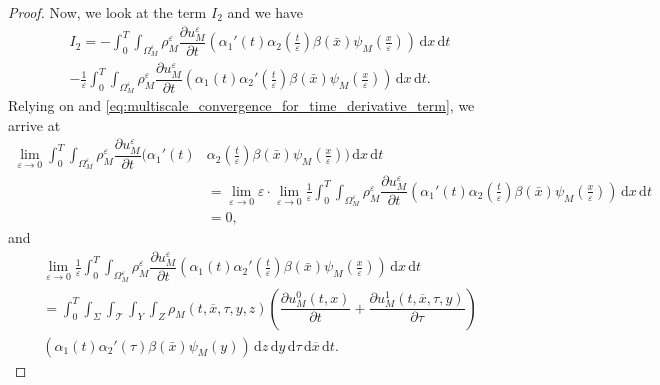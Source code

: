 \documentclass[11pt]{article}
\def\es{\varepsilon}
\def\omm{\Omega_M^\varepsilon}
\def\p{\partial}
\def\mint{\int_{0}^{T}\int_{\Sigma}\int_{\mathcal{T}}\int_{Y}\int_{Z}}
\def\dzdy{\di{z}\di{y}\di{\tau}\di{\overline{x}}\di{t}}
\def\T{\mathcal{T}}
\newcommand{\di}[1]{\,\mathrm{d}#1}
\begin{document}
\begin{proof}
Now, we look at the term $I_2$ and we have 
\begin{multline*}
    I_2=- \int_0^T\int_{\omm}  {\rho_M^\es} \dfrac{\partial u_M^\es}{\partial t} ( \alpha_1'(t)\alpha_2(\frac{t}{\es})\beta(\bar x) \psi_M(\frac{x}{\es}))\di{x}\di{t}\\
    -\frac{1}{\es} \int_0^T\int_{\omm} {\rho_M^\es} \dfrac{\partial u_M^\es}{\partial t} ( \alpha_1(t)\alpha_2'(\frac{t}{\es})\beta(\bar x) \psi_M(\frac{x}{\es}))\di{x}\di{t}.
\end{multline*}
Relying on   and \eqref{eq:multiscale_convergence_for_time_derivative_term}, we arrive at
\begin{align*}
    \lim_{\es\rightarrow 0}\int_0^T\int_{\omm}  {\rho_M^\es} \dfrac{\partial u_M^\es}{\partial t} ( \alpha_1'(t)&\alpha_2(\frac{t}{\es})\beta(\bar x) \psi_M(\frac{x}{\es}))\di{x}\di{t}\\
    &=\lim_{\es\rightarrow 0}\es\cdot \lim_{\es\rightarrow 0} \frac 1\es \int_0^T\int_{\omm}  {\rho_M^\es} \dfrac{\partial u_M^\es}{\partial t} ( \alpha_1'(t)\alpha_2(\frac{t}{\es})\beta(\bar x) \psi_M(\frac{x}{\es}))\di{x}\di{t}\\
    &= 0,
\end{align*}
and
\begin{multline*}
    \lim_{\es\rightarrow 0}\frac{1}{\es} \int_0^T\int_{\omm} {\rho_M^\es} \dfrac{\partial u_M^\es}{\partial t} ( \alpha_1(t)\alpha_2'(\frac{t}{\es})\beta(\bar x) \psi_M(\frac{x}{\es}))\di{x}\di{t}\\
    = \mint  {\rho_M(t,\overline{x},\tau,y,z)} \left(\dfrac{\partial u_M^0(t,x)}{\partial t}+ \dfrac{\partial u_M^1(t,\overline{x},\tau,y)}{\partial \tau}\right) \\ ( \alpha_1(t)\alpha_2'(\tau)\beta(\bar x) \psi_M(y))\dzdy.
\end{multline*}

\end{proof}
\end{document}
